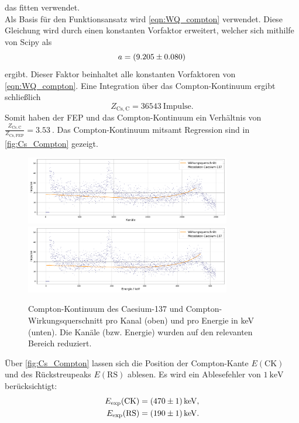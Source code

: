 das fitten verwendet. \\
Als Basis für den Funktionsansatz wird \autoref{eqn:WQ_compton} verwendet. Diese Gleichung wird durch einen konstanten Vorfaktor erweitert, welcher
sich mithilfe von Scipy\cite{scipy} als
\begin{equation}
    a = \qty{9.205 \pm 0.080}{}
\end{equation}
ergibt. Dieser Faktor beinhaltet alle konstanten Vorfaktoren von \autoref{eqn:WQ_compton}. Eine Integration über das Compton-Kontinuum ergibt schließlich
\begin{equation}
    Z_{\mathrm{Cs, C}} = \qty{36543}{\mathrm{Impulse}}.
\end{equation}
Somit haben der FEP und das Compton-Kontinuum ein Verhältnis von $\frac{Z_{\mathrm{Cs, C}}}{Z_{\mathrm{Cs, FEP}}} = \qty{3.53}{}$. Das Compton-Kontinuum mitsamt Regression sind in \autoref{fig:Cs_Compton} gezeigt.
\begin{figure}
    \centering
    \includegraphics[width = 0.8\textwidth]{plots/caesium_compton_channel.pdf}
    \includegraphics[width = 0.8\textwidth]{plots/caesium_compton_energy.pdf}
    \caption{Compton-Kontinuum des Caesium-137 und Compton-Wirkungsquerschnitt pro Kanal (oben) und pro Energie in keV (unten). Die Kanäle (bzw. Energie) wurden auf den relevanten Bereich reduziert.}
    \label{fig:Cs_Compton}
\end{figure}
Über \autoref{fig:Cs_Compton} lassen sich die Position der Compton-Kante $E(\mathrm{CK})$ und des Rückstreupeaks $E(\mathrm{RS})$ ablesen. Es wird ein Ablesefehler von $\qty{1}{\kilo\electronvolt}$
berücksichtigt:
\begin{align}
    E_{\mathrm{exp}}(\mathrm{CK}) &= \qty{470 \pm 1}{\kilo\electronvolt},\\
    E_{\mathrm{exp}}(\mathrm{RS}) &= \qty{190 \pm 1}{\kilo\electronvolt}.
\end{align}
